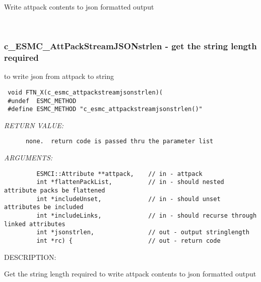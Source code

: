        Write attpack contents to json formatted output
   
 
\mbox{}\hrulefill\ 
 
\subsubsection [c\_ESMC\_AttPackStreamJSONstrlen] {c\_ESMC\_AttPackStreamJSONstrlen - get the string length required}


                                                to write json from attpack to
                                                string
  
\begin{verbatim} void FTN_X(c_esmc_attpackstreamjsonstrlen)(
 #undef  ESMC_METHOD
 #define ESMC_METHOD "c_esmc_attpackstreamjsonstrlen()"\end{verbatim}{\em RETURN VALUE:}
\begin{verbatim}      none.  return code is passed thru the parameter list\end{verbatim}{\em ARGUMENTS:}
\begin{verbatim}         ESMCI::Attribute **attpack,    // in - attpack
         int *flattenPackList,          // in - should nested attribute packs be flattened
         int *includeUnset,             // in - should unset attributes be included
         int *includeLinks,             // in - should recurse through linked attributes
         int *jsonstrlen,               // out - output stringlength
         int *rc) {                     // out - return code\end{verbatim}
{\sf DESCRIPTION:\\ }


       Get the string length required to write attpack contents to json
       formatted output
  
\setlength{\parskip}{\oldparskip}
\setlength{\parindent}{\oldparindent}
\setlength{\baselineskip}{\oldbaselineskip}
